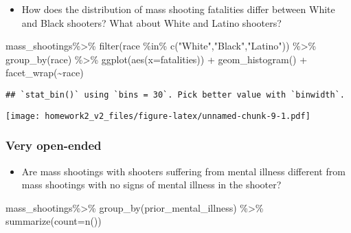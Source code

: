 \documentclass[
]{article}
\newenvironment{Shaded}{\begin{snugshade}}{\end{snugshade}}
\newcommand{\AttributeTok}[1]{\textcolor[rgb]{0.77,0.63,0.00}{#1}}
\newcommand{\FunctionTok}[1]{\textcolor[rgb]{0.00,0.00,0.00}{#1}}
\newcommand{\NormalTok}[1]{#1}
\newcommand{\SpecialCharTok}[1]{\textcolor[rgb]{0.00,0.00,0.00}{#1}}
\newcommand{\StringTok}[1]{\textcolor[rgb]{0.31,0.60,0.02}{#1}}
\providecommand{\tightlist}{%
  \setlength{\itemsep}{0pt}\setlength{\parskip}{0pt}}
\begin{document}
\begin{itemize}
\tightlist
\item
  How does the distribution of mass shooting fatalities differ between
  White and Black shooters? What about White and Latino shooters?
\end{itemize}

\begin{Shaded}
\begin{Highlighting}[]
\NormalTok{mass\_shootings}\SpecialCharTok{\%\textgreater{}\%} 
  \FunctionTok{filter}\NormalTok{(race }\SpecialCharTok{\%in\%} \FunctionTok{c}\NormalTok{(}\StringTok{"White"}\NormalTok{,}\StringTok{"Black"}\NormalTok{,}\StringTok{"Latino"}\NormalTok{)) }\SpecialCharTok{\%\textgreater{}\%} 
 \FunctionTok{group\_by}\NormalTok{(race) }\SpecialCharTok{\%\textgreater{}\%} 
  \FunctionTok{ggplot}\NormalTok{(}\FunctionTok{aes}\NormalTok{(}\AttributeTok{x=}\NormalTok{fatalities)) }\SpecialCharTok{+}
  \FunctionTok{geom\_histogram}\NormalTok{() }\SpecialCharTok{+}
  \FunctionTok{facet\_wrap}\NormalTok{(}\SpecialCharTok{\textasciitilde{}}\NormalTok{race)}
\end{Highlighting}
\end{Shaded}

\begin{verbatim}
## `stat_bin()` using `bins = 30`. Pick better value with `binwidth`.
\end{verbatim}

\texttt{[image: homework2\_v2\_files/figure-latex/unnamed-chunk-9-1.pdf]}

\hypertarget{very-open-ended}{%
\subsubsection{Very open-ended}\label{very-open-ended}}

\begin{itemize}
\tightlist
\item
  Are mass shootings with shooters suffering from mental illness
  different from mass shootings with no signs of mental illness in the
  shooter?
\end{itemize}

\begin{Shaded}
\begin{Highlighting}[]
\NormalTok{mass\_shootings}\SpecialCharTok{\%\textgreater{}\%} 
 \FunctionTok{group\_by}\NormalTok{(prior\_mental\_illness) }\SpecialCharTok{\%\textgreater{}\%} 
  \FunctionTok{summarize}\NormalTok{(}\AttributeTok{count=}\FunctionTok{n}\NormalTok{())}
\end{Highlighting}
\end{Shaded}
\end{document}
